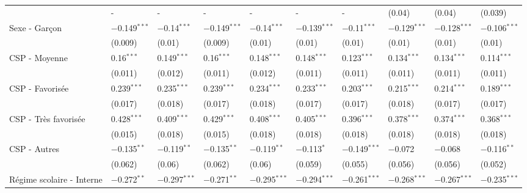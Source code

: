 \documentclass[
]{book}
\begin{document}
\begin{ThreePartTable}
\begin{longtable}[t]{llllllllll}
\hspace{1em} & - & - & - & - & - & - & (0.04) & (0.04) & (0.039)\\
\hspace{1em}Sexe - Garçon & $-$0.149$^{***}$ & $-$0.14$^{***}$ & $-$0.149$^{***}$ & $-$0.14$^{***}$ & $-$0.139$^{***}$ & $-$0.11$^{***}$ & $-$0.129$^{***}$ & $-$0.128$^{***}$ & $-$0.106$^{***}$\\
\hspace{1em} & (0.009) & (0.01) & (0.009) & (0.01) & (0.01) & (0.01) & (0.01) & (0.01) & (0.01)\\
\hspace{1em}CSP - Moyenne & 0.16$^{***}$ & 0.149$^{***}$ & 0.16$^{***}$ & 0.148$^{***}$ & 0.148$^{***}$ & 0.123$^{***}$ & 0.134$^{***}$ & 0.134$^{***}$ & 0.114$^{***}$\\
\hspace{1em} & (0.011) & (0.012) & (0.011) & (0.012) & (0.011) & (0.011) & (0.011) & (0.011) & (0.011)\\
\hspace{1em}CSP - Favorisée & 0.239$^{***}$ & 0.235$^{***}$ & 0.239$^{***}$ & 0.234$^{***}$ & 0.233$^{***}$ & 0.203$^{***}$ & 0.215$^{***}$ & 0.214$^{***}$ & 0.189$^{***}$\\
\hspace{1em} & (0.017) & (0.018) & (0.017) & (0.018) & (0.017) & (0.017) & (0.018) & (0.017) & (0.017)\\
\hspace{1em}CSP - Très favorisée & 0.428$^{***}$ & 0.409$^{***}$ & 0.429$^{***}$ & 0.408$^{***}$ & 0.405$^{***}$ & 0.396$^{***}$ & 0.378$^{***}$ & 0.374$^{***}$ & 0.368$^{***}$\\
\hspace{1em} & (0.015) & (0.018) & (0.015) & (0.018) & (0.018) & (0.018) & (0.018) & (0.018) & (0.018)\\
\hspace{1em}CSP - Autres & $-$0.135$^{**}$ & $-$0.119$^{**}$ & $-$0.135$^{**}$ & $-$0.119$^{**}$ & $-$0.113$^{*}$ & $-$0.149$^{***}$ & $-$0.072 & $-$0.068 & $-$0.116$^{**}$\\
\hspace{1em} & (0.062) & (0.06) & (0.062) & (0.06) & (0.059) & (0.055) & (0.056) & (0.056) & (0.052)\\
\hspace{1em}Régime scolaire - Interne & $-$0.272$^{**}$ & $-$0.297$^{***}$ & $-$0.271$^{**}$ & $-$0.295$^{***}$ & $-$0.294$^{***}$ & $-$0.261$^{***}$ & $-$0.268$^{***}$ & $-$0.267$^{***}$ & $-$0.235$^{***}$\\

\end{longtable}
\end{ThreePartTable}
\end{document}
